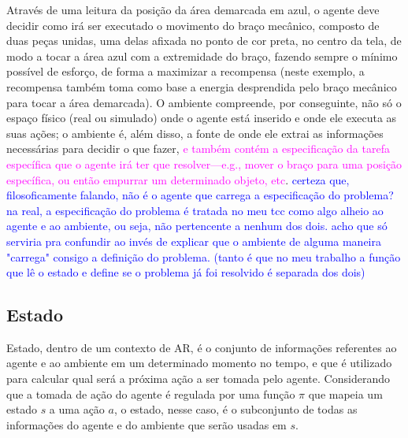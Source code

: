 \documentclass[cic,tc]{iiufrgs}
\newcommand\bruno[1]{\textcolor{magenta}{#1}}
\newcommand\henrique[1]{\textcolor{blue}{#1}}
\begin{document}
Através de uma leitura da posição da área demarcada em azul, o agente deve decidir como irá ser executado o movimento do braço mecânico, composto
de duas peças unidas, uma delas afixada no ponto de cor preta, no centro da tela, de modo a tocar a área azul com a extremidade do braço, fazendo
sempre o mínimo possível de esforço, de forma a maximizar a recompensa (neste exemplo, a recompensa também toma como base a energia desprendida pelo
braço mecânico para tocar a área demarcada). O ambiente compreende, por conseguinte, não só o espaço físico (real ou simulado) onde o agente está inserido e onde ele
executa as suas ações; o ambiente é, além disso, a fonte de onde ele extrai as informações necessárias para decidir o que fazer,
\bruno{e também contém a especificação da tarefa específica que o agente irá ter que resolver---e.g., mover o braço para uma posição específica, ou então empurrar um determinado objeto, etc}.
\henrique{certeza que, filosoficamente falando, não é o agente que carrega a especificação do problema? na real, a especificação do problema é tratada no meu tcc como algo
alheio ao agente e ao ambiente, ou seja, não pertencente a nenhum dos dois. acho que só serviria pra confundir ao invés de explicar que o ambiente de alguma maneira "carrega" consigo a definição do problema.
 (tanto é que no meu trabalho a função que lê o estado e define se o problema já foi resolvido é separada dos dois)}

\subsection{Estado}
Estado, dentro de um contexto de AR, é o conjunto de informações referentes ao agente e ao ambiente em um determinado momento no tempo, e que é utilizado para calcular
qual será a próxima ação a ser tomada pelo agente. Considerando que a tomada de ação do agente é regulada por uma função $\pi$ que mapeia um estado
$s$ a uma ação $a$, o estado, nesse caso, é o subconjunto de todas as informações do agente e do ambiente que serão usadas em $s$.
\end{document}
